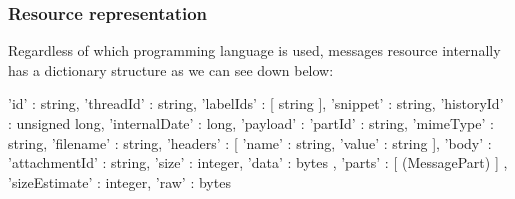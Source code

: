 \subsubsection{Resource representation}\label{sssect:msgresrep}

Regardless of which programming language is used, messages resource \citep[/v1/reference/users/messages]{gmailAPI} internally has a dictionary structure as we can see down below:

\begin{python}
{
'id' : string,
'threadId' : string,
'labelIds' : [ string ],
'snippet' : string,
'historyId' : unsigned long,
'internalDate' : long,
'payload' : {
	'partId' : string,
	'mimeType' : string,
	'filename' : string,
	'headers' : [
		{
		'name' : string,
		'value' : string
		}
	],
	'body' : {
		'attachmentId' : string,
		'size' : integer,
		'data' : bytes
	},
	'parts' : [ (MessagePart) ]
	},
'sizeEstimate' : integer,
'raw' : bytes
}
\end{python}

